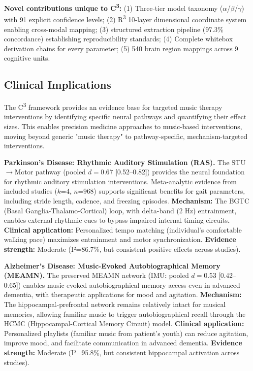 \documentclass[9pt,onecolumn]{article}
\newcommand{\Cthree}{C\textsuperscript{3}}
\begin{document}
\textbf{Novel contributions unique to \Cthree{}:} (1) Three-tier model taxonomy ($\alpha$/$\beta$/$\gamma$) with 91 explicit confidence levels; (2) R\textsuperscript{3} 10-layer dimensional coordinate system enabling cross-modal mapping; (3) structured extraction pipeline (97.3\% concordance) establishing reproducibility standards; (4) Complete whitebox derivation chains for every parameter; (5) 540 brain region mappings across 9 cognitive units.

\subsection{Clinical Implications}

The \Cthree{} framework provides an evidence base for targeted music therapy interventions by identifying specific neural pathways and quantifying their effect sizes. This enables precision medicine approaches to music-based interventions, moving beyond generic "music therapy" to pathway-specific, mechanism-targeted interventions.

\textbf{Parkinson's Disease: Rhythmic Auditory Stimulation (RAS).} The STU$\rightarrow$Motor pathway (pooled $d=0.67$ [0.52--0.82]) provides the neural foundation for rhythmic auditory stimulation interventions. Meta-analytic evidence from included studies ($k$=4, $n$=968) supports significant benefits for gait parameters, including stride length, cadence, and freezing episodes. \textbf{Mechanism:} The BGTC (Basal Ganglia-Thalamo-Cortical) loop, with delta-band (2 Hz) entrainment, enables external rhythmic cues to bypass impaired internal timing circuits. \textbf{Clinical application:} Personalized tempo matching (individual's comfortable walking pace) maximizes entrainment and motor synchronization. \textbf{Evidence strength:} Moderate (I²=86.7\%, but consistent positive effects across studies).

\textbf{Alzheimer's Disease: Music-Evoked Autobiographical Memory (MEAMN).} The preserved MEAMN network (IMU: pooled $d=0.53$ [0.42--0.65]) enables music-evoked autobiographical memory access even in advanced dementia, with therapeutic applications for mood and agitation. \textbf{Mechanism:} The hippocampal-prefrontal network remains relatively intact for musical memories, allowing familiar music to trigger autobiographical recall through the HCMC (Hippocampal-Cortical Memory Circuit) model. \textbf{Clinical application:} Personalized playlists (familiar music from patient's youth) can reduce agitation, improve mood, and facilitate communication in advanced dementia. \textbf{Evidence strength:} Moderate (I²=95.8\%, but consistent hippocampal activation across studies).
\end{document}

